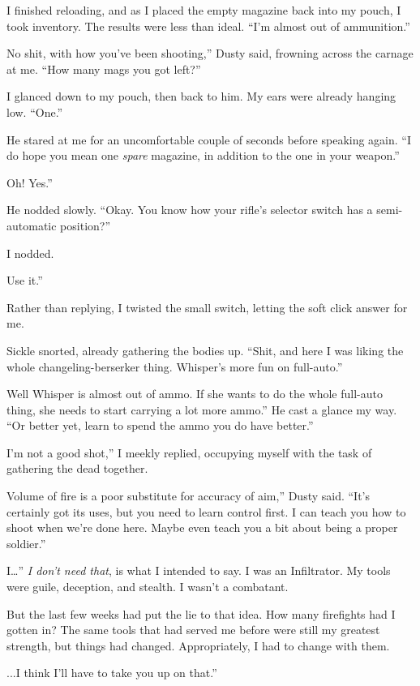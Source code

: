 I finished reloading, and as I placed the empty magazine back into my pouch, I took inventory. The results were less than ideal. “I’m almost out of ammunition.”

\leavevmode{}No shit, with how you’ve been shooting,” Dusty said, frowning across the carnage at me. “How many mags you got left?”

I glanced down to my pouch, then back to him. My ears were already hanging low. “One.”

He stared at me for an uncomfortable couple of seconds before speaking again. “I do hope you mean one \textit{spare} magazine, in addition to the one in your weapon.”

\leavevmode{}Oh! Yes.”

He nodded slowly. “Okay. You know how your rifle’s selector switch has a semi-automatic position?”

I nodded.

\leavevmode{}Use it.”

Rather than replying, I twisted the small switch, letting the soft click answer for me.

Sickle snorted, already gathering the bodies up. “Shit, and here I was liking the whole changeling-berserker thing. Whisper’s more fun on full-auto.”

\leavevmode{}Well Whisper is almost out of ammo. If she wants to do the whole full-auto thing, she needs to start carrying a lot more ammo.” He cast a glance my way. “Or better yet, learn to spend the ammo you do have better.”

\leavevmode{}I’m not a good shot,” I meekly replied, occupying myself with the task of gathering the dead together.

\leavevmode{}Volume of fire is a poor substitute for accuracy of aim,” Dusty said. “It’s certainly got its uses, but you need to learn control first. I can teach you how to shoot when we’re done here. Maybe even teach you a bit about being a proper soldier.”

\leavevmode{}I…” \textit{I don’t need that}, is what I intended to say. I was an Infiltrator. My tools were guile, deception, and stealth. I wasn’t a combatant.

But the last few weeks had put the lie to that idea. How many firefights had I gotten in? The same tools that had served me before were still my greatest strength, but things had changed. Appropriately, I had to change with them.

\leavevmode{}...I think I’ll have to take you up on that.”

